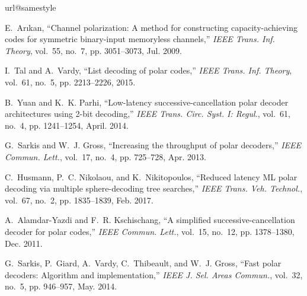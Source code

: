 \documentclass[conference]{IEEEtran}
\begin{document}
\begin{thebibliography}{10}
\providecommand{\url}[1]{#1}
\csname url@samestyle\endcsname
\providecommand{\newblock}{\relax}
\providecommand{\bibinfo}[2]{#2}
\providecommand{\BIBentrySTDinterwordspacing}{\spaceskip=0pt\relax}
\providecommand{\BIBentryALTinterwordstretchfactor}{4}
\providecommand{\BIBentryALTinterwordspacing}{\spaceskip=\fontdimen2\font plus
\BIBentryALTinterwordstretchfactor\fontdimen3\font minus
  \fontdimen4\font\relax}
\providecommand{\BIBforeignlanguage}[2]{{%
\expandafter\ifx\csname l@#1\endcsname\relax
\typeout{** WARNING: IEEEtran.bst: No hyphenation pattern has been}%
\typeout{** loaded for the language `#1'. Using the pattern for}%
\typeout{** the default language instead.}%
\else
\language=\csname l@#1\endcsname
\fi
#2}}
\providecommand{\BIBdecl}{\relax}
\BIBdecl

E.~Ar{\i}kan, ``Channel polarization: A method for constructing
  capacity-achieving codes for symmetric binary-input memoryless channels,''
  \emph{IEEE Trans. Inf. Theory}, vol.~55, no.~7, pp. 3051--3073, Jul. 2009.

I.~Tal and A.~Vardy, ``List decoding of polar codes,'' \emph{IEEE Trans. Inf.
  Theory}, vol.~61, no.~5, pp. 2213--2226, 2015.

B.~{Yuan} and K.~K. {Parhi}, ``Low-latency successive-cancellation polar
  decoder architectures using 2-bit decoding,'' \emph{IEEE Trans. Circ. Syst.
  I: Regul.}, vol.~61, no.~4, pp. 1241--1254, April. 2014.

G.~Sarkis and W.~J. Gross, ``Increasing the throughput of polar decoders,''
  \emph{IEEE Commun. Lett.}, vol.~17, no.~4, pp. 725--728, Apr. 2013.

C.~Husmann, P.~C. Nikolaou, and K.~Nikitopoulos, ``Reduced latency {ML} polar
  decoding via multiple sphere-decoding tree searches,'' \emph{IEEE Trans. Veh.
  Technol.}, vol.~67, no.~2, pp. 1835--1839, Feb. 2017.

A.~Alamdar-Yazdi and F.~R. Kschischang, ``A simplified successive-cancellation
  decoder for polar codes,'' \emph{IEEE Commun. Lett.}, vol.~15, no.~12, pp.
  1378--1380, Dec. 2011.

G.~Sarkis, P.~Giard, A.~Vardy, C.~Thibeault, and W.~J. Gross, ``Fast polar
  decoders: Algorithm and implementation,'' \emph{IEEE J. Sel. Areas Commun.},
  vol.~32, no.~5, pp. 946--957, May. 2014.


\end{thebibliography}
\end{document}
